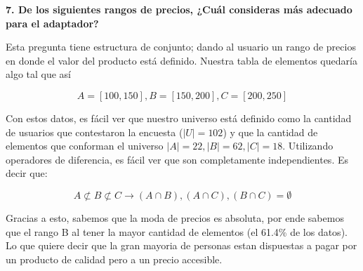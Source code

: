 \textbf{7. De los siguientes rangos de precios, ¿Cuál consideras más adecuado para el adaptador?}

\tab Esta pregunta tiene estructura de conjunto; dando al usuario un rango de precios en donde el valor del producto está definido. Nuestra tabla de elementos quedaría algo tal que así

\begin{equation}
    A = [100, 150], B = [150, 200], C = [200, 250]
\end{equation}

\tab Con estos datos, es fácil ver que nuestro universo está definido como la cantidad de usuarios que contestaron la encuesta ($|U|=102$) y que la cantidad de elementos que conforman el universo $|A|=22, |B|=62, |C|=18$. Utilizando operadores de diferencia, es fácil ver que son completamente independientes. Es decir que:

\begin{equation}
    A \not\subset B \not\subset C \to (A\cap B),(A\cap C),(B\cap C) = \emptyset
\end{equation}

\tab Gracias a esto, sabemos que la moda de precios es absoluta, por ende sabemos que el rango B al tener la mayor cantidad de elementos (el 61.4\% de los datos). Lo que quiere decir que la gran mayoria de personas estan dispuestas a pagar por un producto de calidad pero a un precio accesible.